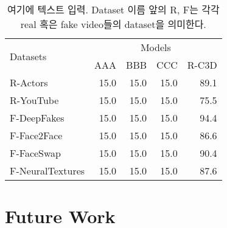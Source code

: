 \documentclass{article}
\begin{document}
	\begin{table}[t]
		\caption{여기에 텍스트 입력. Dataset 이름 앞의 \textsc{R}, \textsc{F}는 각각 real 혹은 fake video들의 dataset을 의미한다.}
		\label{conclusion}
		\vskip 0.15in
		\begin{center}
			\begin{small}
				\begin{sc}
					\begin{tabular}{lrrrr}
						\toprule
						\multirow{2}{*}{Datasets}	&	\multicolumn{4}{c}{Models}		\\
						&	AAA	&	BBB	&	CCC	&	R-C3D	\\
						\midrule
						R-Actors		&	15.0	&	15.0	&	15.0	&	89.1	\\
						R-YouTube		&	15.0	&	15.0	&	15.0	&	75.5	\\
						F-DeepFakes		&	15.0	&	15.0	&	15.0	&	94.4	\\
						F-Face2Face		&	15.0	&	15.0	&	15.0	&	86.6	\\
						F-FaceSwap		&	15.0	&	15.0	&	15.0	&	90.4	\\
						F-NeuralTextures &	15.0	&	15.0	&	15.0	&	87.6	\\
						\bottomrule
					\end{tabular}
				\end{sc}
			\end{small}
		\end{center}
		\vskip -0.1in
	\end{table}
	
	\section{Future Work}
	
	
	
	
	
	
	
\end{document}
